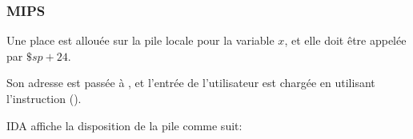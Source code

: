 \subsubsection{MIPS}

Une place est allouée sur la pile locale pour la variable $x$, et elle doit être appelée par $\$sp+24$.

Son adresse est passée à \scanf, et l'entrée de l'utilisateur est chargée en utilisant
l'instruction  ().



IDA affiche la disposition de la pile comme suit:



